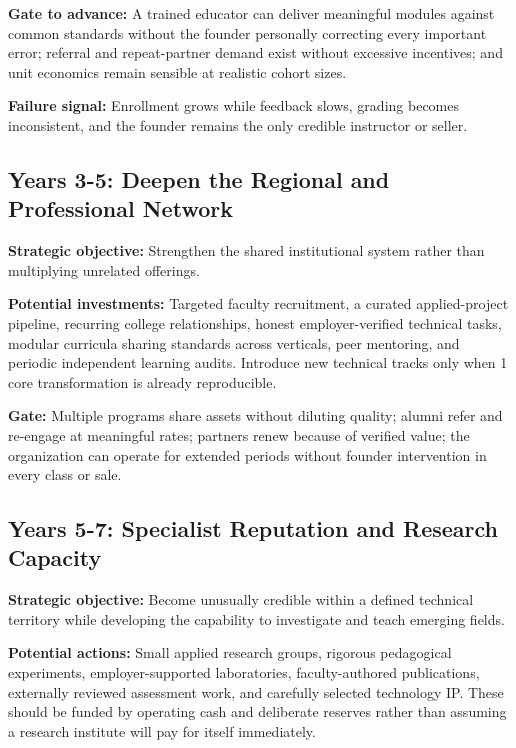 \vspace{0.5em}
\noindent\textbf{Gate to advance:} A trained educator can deliver meaningful modules against common standards without the founder personally correcting every important error; referral and repeat-partner demand exist without excessive incentives; and unit economics remain sensible at realistic cohort sizes.

\vspace{0.5em}
\noindent\textbf{Failure signal:} Enrollment grows while feedback slows, grading becomes inconsistent, and the founder remains the only credible instructor or seller.

\subsection{Years 3-5: Deepen the Regional and Professional Network}
\label{sec:years_3_5_deepen_network}

\textbf{Strategic objective:} Strengthen the shared institutional system rather than multiplying unrelated offerings.

\vspace{0.5em}
\noindent\textbf{Potential investments:} Targeted faculty recruitment, a curated applied-project pipeline, recurring college relationships, honest employer-verified technical tasks, modular curricula sharing standards across verticals, peer mentoring, and periodic independent learning audits. Introduce new technical tracks only when 1 core transformation is already reproducible.

\vspace{0.5em}
\noindent\textbf{Gate:} Multiple programs share assets without diluting quality; alumni refer and re-engage at meaningful rates; partners renew because of verified value; the organization can operate for extended periods without founder intervention in every class or sale.

\subsection{Years 5-7: Specialist Reputation and Research Capacity}
\label{sec:years_5_7_specialist_reputation}

\textbf{Strategic objective:} Become unusually credible within a defined technical territory while developing the capability to investigate and teach emerging fields.

\vspace{0.5em}
\noindent\textbf{Potential actions:} Small applied research groups, rigorous pedagogical experiments, employer-supported laboratories, faculty-authored publications, externally reviewed assessment work, and carefully selected technology IP. These should be funded by operating cash and deliberate reserves rather than assuming a research institute will pay for itself immediately.

